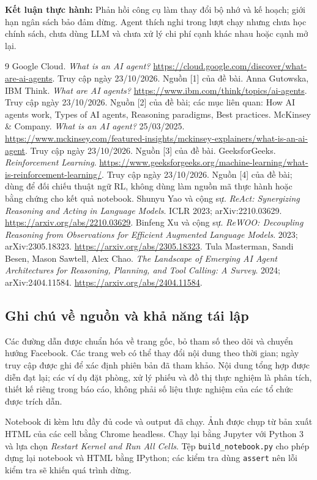 \documentclass[11pt,a4paper]{article}
\begin{document}
\noindent\textbf{Kết luận thực hành:} Phản hồi công cụ làm thay đổi bộ nhớ và kế hoạch;
giới hạn ngân sách bảo đảm dừng. Agent thích nghi trong lượt chạy nhưng chưa học chính
sách, chưa dùng LLM và chưa xử lý chi phí cạnh khác nhau hoặc cạnh mở lại.

\newpage
\begin{thebibliography}{9}
 Google Cloud. \emph{What is an AI agent?}
\url{https://cloud.google.com/discover/what-are-ai-agents}.
Truy cập ngày 23/10/2026. Nguồn [1] của đề bài.
 Anna Gutowska, IBM Think. \emph{What are AI agents?}
\url{https://www.ibm.com/think/topics/ai-agents}.
Truy cập ngày 23/10/2026. Nguồn [2] của đề bài; các mục liên quan:
How AI agents work, Types of AI agents, Reasoning paradigms, Best practices.
 McKinsey \& Company. \emph{What is an AI agent?}
25/03/2025.
\url{https://www.mckinsey.com/featured-insights/mckinsey-explainers/what-is-an-ai-agent}.
Truy cập ngày 23/10/2026. Nguồn [3] của đề bài.
 GeeksforGeeks. \emph{Reinforcement Learning}.
\url{https://www.geeksforgeeks.org/machine-learning/what-is-reinforcement-learning/}.
Truy cập ngày 23/10/2026. Nguồn [4] của đề bài; dùng để đối chiếu thuật ngữ RL,
không dùng làm nguồn mã thực hành hoặc bằng chứng cho kết quả notebook.
 Shunyu Yao và cộng sự. \emph{ReAct: Synergizing Reasoning and Acting
in Language Models}. ICLR 2023; arXiv:2210.03629.
\url{https://arxiv.org/abs/2210.03629}.
 Binfeng Xu và cộng sự. \emph{ReWOO: Decoupling Reasoning from
Observations for Efficient Augmented Language Models}. 2023; arXiv:2305.18323.
\url{https://arxiv.org/abs/2305.18323}.
 Tula Masterman, Sandi Besen, Mason Sawtell, Alex Chao.
\emph{The Landscape of Emerging AI Agent Architectures for Reasoning, Planning,
and Tool Calling: A Survey}. 2024; arXiv:2404.11584.
\url{https://arxiv.org/abs/2404.11584}.
\end{thebibliography}

\subsection*{Ghi chú về nguồn và khả năng tái lập}
Các đường dẫn được chuẩn hóa về trang gốc, bỏ tham số theo dõi và chuyển hướng Facebook.
Các trang web có thể thay đổi nội dung theo thời gian; ngày truy cập được ghi để xác
định phiên bản đã tham khảo. Nội dung tổng hợp được diễn đạt lại; các ví dụ đặt phòng,
xử lý phiếu và đồ thị thực nghiệm là phân tích, thiết kế riêng trong báo cáo, không
phải số liệu thực nghiệm của các tổ chức được trích dẫn.

Notebook đi kèm lưu đầy đủ code và output đã chạy. Ảnh được chụp từ bản xuất HTML
của các cell bằng Chrome headless. Chạy lại bằng Jupyter với Python 3 và lựa chọn
\textit{Restart Kernel and Run All Cells}. Tệp \texttt{build\_notebook.py} cho phép dựng
lại notebook và HTML bằng IPython; các kiểm tra dùng \texttt{assert} nên lỗi kiểm tra
sẽ khiến quá trình dừng.
\end{document}
